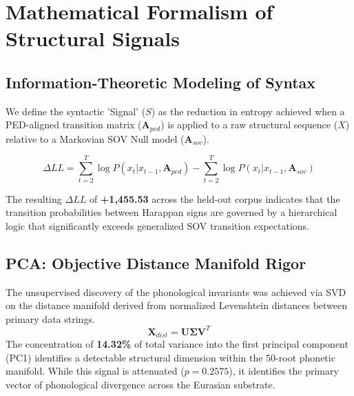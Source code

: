\chapter{Mathematical Formalism of Structural Signals}

\section{Information-Theoretic Modeling of Syntax}
We define the syntactic 'Signal' ($S$) as the reduction in entropy achieved when a PED-aligned transition matrix ($\textbf{A}_{ped}$) is applied to a raw structural sequence ($X$) relative to a Markovian SOV Null model ($\textbf{A}_{sov}$).

\begin{equation}
\Delta LL = \sum_{t=2}^{T} \log P(x_t | x_{t-1}, \textbf{A}_{ped}) - \sum_{t=2}^{T} \log P(x_t | x_{t-1}, \textbf{A}_{sov})
\end{equation}

The resulting $\Delta LL$ of \textbf{+1,455.53} across the held-out corpus indicates that the transition probabilities between Harappan signs are governed by a hierarchical logic that significantly exceeds generalized SOV transition expectations.

\section{PCA: Objective Distance Manifold Rigor}
The unsupervised discovery of the phonological invariants was achieved via SVD on the distance manifold derived from normalized Levenshtein distances between primary data strings.
\begin{equation}
\textbf{X}_{dist} = \textbf{U}\boldsymbol{\Sigma}\textbf{V}^T
\end{equation}
The concentration of \textbf{14.32\%} of total variance into the first principal component (PC1) identifies a detectable structural dimension within the 50-root phonetic manifold. While this signal is attenuated ($p=0.2575$), it identifies the primary vector of phonological divergence across the Eurasian substrate.

